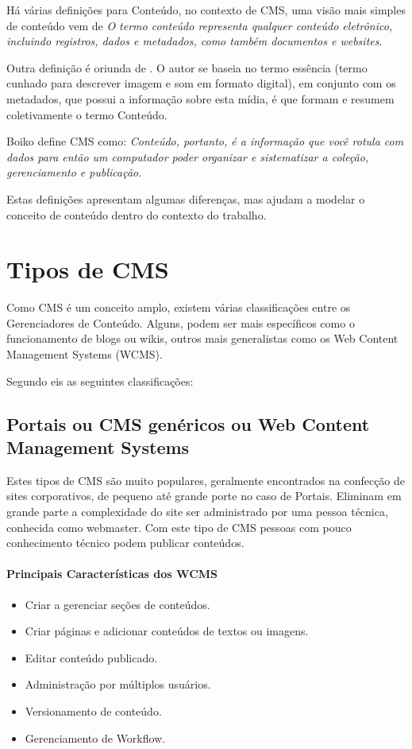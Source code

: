 Há várias definições para Conteúdo, no contexto de CMS, uma visão mais simples de conteúdo vem de \cite{ecm_paper} \emph{O termo conteúdo representa qualquer conteúdo eletrônico, incluindo registros, dados e metadados, como também documentos e websites}.  

Outra definição é oriunda de \cite{thomas_cms_education}. O autor se baseia no termo essência (termo cunhado para descrever imagem e som em formato digital), em conjunto com os metadados, que possui a informação sobre esta mídia, é que formam e resumem coletivamente o termo Conteúdo. 

Boiko \cite{cms_bible} define CMS como: \emph{Conteúdo, portanto, é a informação que você rotula com dados para então um computador poder organizar e sistematizar a coleção, gerenciamento e publicação}. 

Estas definições apresentam algumas diferenças, mas ajudam a modelar o conceito de conteúdo dentro do contexto do trabalho.

\section{Tipos de CMS}

Como CMS é um conceito amplo, existem várias classificações entre os Gerenciadores de Conteúdo. Alguns, podem ser mais específicos como o funcionamento de blogs ou wikis, outros mais generalistas como os Web Content Management Systems (WCMS). 

Segundo \cite{choosing_open_source_cms} eis as seguintes classificações: 

\subsection{Portais ou CMS genéricos ou Web Content Management Systems} 

Estes tipos de CMS são muito populares, geralmente encontrados na confecção de sites corporativos, de pequeno até grande porte no caso de Portais. Eliminam em grande parte a complexidade do site ser administrado por uma pessoa técnica, conhecida como webmaster. Com este tipo de CMS pessoas com pouco conhecimento técnico podem publicar conteúdos.

\paragraph{Principais Características dos WCMS}

\begin{itemize}
  \item Criar a gerenciar seções de conteúdos.
  \item Criar páginas e adicionar conteúdos de textos ou imagens.
  \item Editar conteúdo publicado.
  \item Administração por múltiplos usuários.
  \item Versionamento de conteúdo.
  \item Gerenciamento de Workflow.
\end{itemize}

